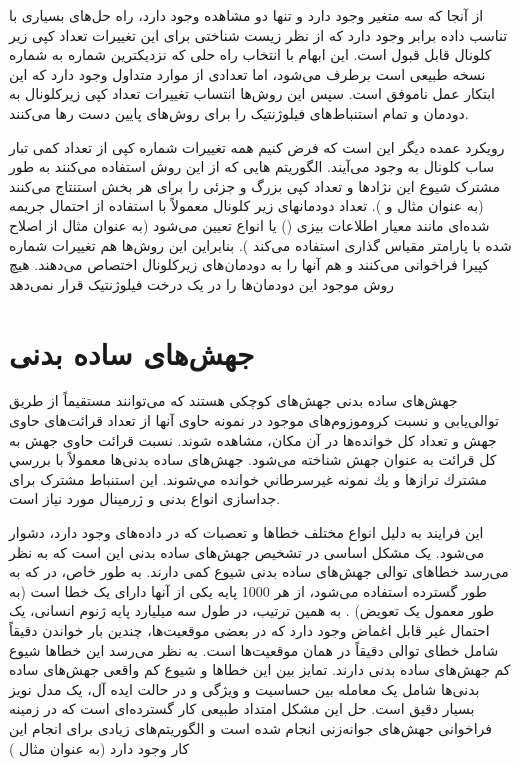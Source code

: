 از آنجا که سه متغیر وجود دارد و تنها دو مشاهده وجود دارد، راه حل‌های بسیاری با تناسب داده برابر وجود دارد که از نظر زیست شناختی برای این تغییرات تعداد کپی زیر کلونال قابل قبول است. این ابهام با انتخاب راه حلی که نزدیکترین شماره به شماره نسخه طبیعی است برطرف می‌شود، اما تعدادی از موارد متداول وجود دارد که این ابتکار عمل ناموفق است. سپس این روش‌ها انتساب تغییرات تعداد کپی زیرکلونال به دودمان و تمام استنباط‌های فیلوژنتیک را برای روش‌های پایین دست رها می‌کنند.


رویکرد عمده دیگر این است که فرض کنیم همه تغییرات شماره کپی از تعداد کمی تبار ساب کلونال به وجود می‌آیند. الگوریتم هایی که از این روش استفاده می‌کنند به طور مشترک شیوع این نژادها و تعداد کپی بزرگ و جزئی را برای هر بخش استنتاج می‌کنند (به عنوان مثال \cite{zhu2011metabolic, vander2009understanding} و  ).  تعداد دودمانهای زیر کلونال معمولاً با استفاده از احتمال جریمه شده‌ای مانند معیار اطلاعات بیزی () یا انواع  تعیین می‌شود (به عنوان مثال  از  اصلاح شده با پارامتر مقیاس گذاری استفاده می‌کند \cite{zhu2011metabolic}). بنابراین این روش‌ها هم تغییرات شماره کپیرا فراخوانی می‌کنند و هم آنها را به دودمان‌های زیرکلونال اختصاص می‌دهند. هیچ روش موجود این دودمان‌ها را در یک درخت فیلوژنتیک قرار نمی‌دهد



\section{جهش‌های ساده بدنی }

جهش‌های ساده بدنی‌ جهش‌های كوچكی هستند كه می‌توانند مستقیماً از طریق توالی‌یابی و نسبت كروموزوم‌های موجود در نمونه حاوی آنها از تعداد قرائت‌های حاوی جهش و تعداد كل خوانده‌ها در آن مكان، مشاهده شوند. نسبت قرائت حاوی جهش به کل قرائت به عنوان  جهش شناخته می‌شود. جهش‌های ساده بدنی‌ها معمولاً با بررسي مشترك ترازها و يك نمونه غير‌سرطاني خوانده مي‌شوند. این استنباط مشترک برای جداسازی انواع بدنی و ژرمینال مورد نیاز است.

این فرایند به دلیل انواع مختلف خطاها و تعصبات که در داده‌های  وجود دارد، دشوار می‌شود\cite{friedl2010plasticity}. یک مشکل اساسی در تشخیص جهش‌های ساده بدنی‌ این است که به نظر می‌رسد خطاهای توالی جهش‌های ساده بدنی شیوع کمی دارند. به طور خاص، در    که به طور گسترده استفاده می‌شود، از هر 1000 پایه یکی از آنها دارای یک خطا است (به طور معمول یک تعویض) \cite{sabeh2009protease}. به همین ترتیب، در طول سه میلیارد پایه ژنوم انسانی، یک احتمال غیر قابل اغماض وجود دارد که در بعضی موقعیت‌ها، چندین بار خواندن دقیقاً شامل خطای توالی دقیقاً در همان موقعیت‌ها است. به نظر می‌رسد این خطاها شیوع کم جهش‌های ساده بدنی دارند. تمایز بین این خطاها و شیوع کم واقعی جهش‌های ساده بدنی‌ها شامل یک معامله بین حساسیت و ویژگی و در حالت ایده آل، یک مدل نویز بسیار دقیق است. حل این مشکل امتداد طبیعی کار گسترده‌ای است که در زمینه فراخوانی جهش‌های جوانه‌زنی انجام شده است و الگوریتم‌های زیادی برای انجام این کار وجود دارد (به عنوان مثال \cite{friedl2010plasticity, demicheli2008effects} )


